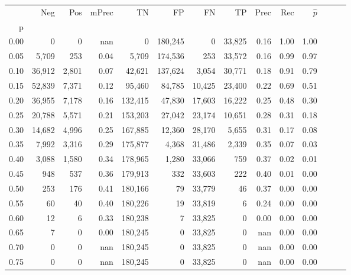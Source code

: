 \begin{tabular}{rrrrrrrrrrrrrr}
\toprule
{} &     Neg &    Pos & mPrec &       TN &       FP &      FN &      TP &  Prec &   Rec & $\hat{p}$ \\
p    &         &        &       &          &          &         &         &       &       &           \\
\midrule
0.00 &       0 &      0 &   nan &        0 &  180,245 &       0 &  33,825 &  0.16 &  1.00 &      1.00 \\
0.05 &   5,709 &    253 &  0.04 &    5,709 &  174,536 &     253 &  33,572 &  0.16 &  0.99 &      0.97 \\
0.10 &  36,912 &  2,801 &  0.07 &   42,621 &  137,624 &   3,054 &  30,771 &  0.18 &  0.91 &      0.79 \\
0.15 &  52,839 &  7,371 &  0.12 &   95,460 &   84,785 &  10,425 &  23,400 &  0.22 &  0.69 &      0.51 \\
0.20 &  36,955 &  7,178 &  0.16 &  132,415 &   47,830 &  17,603 &  16,222 &  0.25 &  0.48 &      0.30 \\
0.25 &  20,788 &  5,571 &  0.21 &  153,203 &   27,042 &  23,174 &  10,651 &  0.28 &  0.31 &      0.18 \\
0.30 &  14,682 &  4,996 &  0.25 &  167,885 &   12,360 &  28,170 &   5,655 &  0.31 &  0.17 &      0.08 \\
0.35 &   7,992 &  3,316 &  0.29 &  175,877 &    4,368 &  31,486 &   2,339 &  0.35 &  0.07 &      0.03 \\
0.40 &   3,088 &  1,580 &  0.34 &  178,965 &    1,280 &  33,066 &     759 &  0.37 &  0.02 &      0.01 \\
0.45 &     948 &    537 &  0.36 &  179,913 &      332 &  33,603 &     222 &  0.40 &  0.01 &      0.00 \\
0.50 &     253 &    176 &  0.41 &  180,166 &       79 &  33,779 &      46 &  0.37 &  0.00 &      0.00 \\
0.55 &      60 &     40 &  0.40 &  180,226 &       19 &  33,819 &       6 &  0.24 &  0.00 &      0.00 \\
0.60 &      12 &      6 &  0.33 &  180,238 &        7 &  33,825 &       0 &  0.00 &  0.00 &      0.00 \\
0.65 &       7 &      0 &  0.00 &  180,245 &        0 &  33,825 &       0 &   nan &  0.00 &      0.00 \\
0.70 &       0 &      0 &   nan &  180,245 &        0 &  33,825 &       0 &   nan &  0.00 &      0.00 \\
0.75 &       0 &      0 &   nan &  180,245 &        0 &  33,825 &       0 &   nan &  0.00 &      0.00 \\

\end{tabular}
